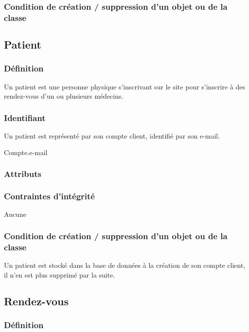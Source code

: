 \documentclass[a4paper, 11pt]{report}
\begin{document}
\subsubsection{Condition de création / suppression d'un objet ou de la classe}

\subsection{Patient}

\subsubsection{Définition}

Un patient est une personne physique s'inscrivant sur le site pour s'inscrire à des rendez-vous d'un ou plusieurs médecins.

\subsubsection{Identifiant}

Un patient est représenté par son compte client, identifié par son e-mail.

Compte.e-mail

\subsubsection{Attributs}

\subsubsection{Contraintes d'intégrité}

Aucune

\subsubsection{Condition de création / suppression d'un objet ou de la classe}

Un patient est stocké dans la base de données à la création de son compte client, il n'en est plus supprimé par la suite.

\subsection{Rendez-vous}

\subsubsection{Définition}
\end{document}
